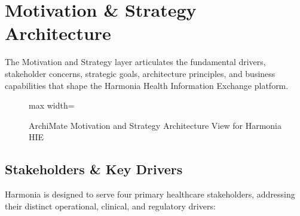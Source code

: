
\chapter{Motivation \& Strategy Architecture}
\label{chap:motivation_strategy}

The Motivation and Strategy layer articulates the fundamental drivers, stakeholder concerns, strategic goals, architecture principles, and business capabilities that shape the Harmonia Health Information Exchange platform.

\begin{figure}[htbp]
    \centering
    \begin{adjustbox}{max width=\textwidth}
        
    \end{adjustbox}
    \caption{ArchiMate Motivation and Strategy Architecture View for Harmonia HIE}
    \label{fig:motivation_map}
\end{figure}

\section{Stakeholders \& Key Drivers}

Harmonia is designed to serve four primary healthcare stakeholders, addressing their distinct operational, clinical, and regulatory drivers:

